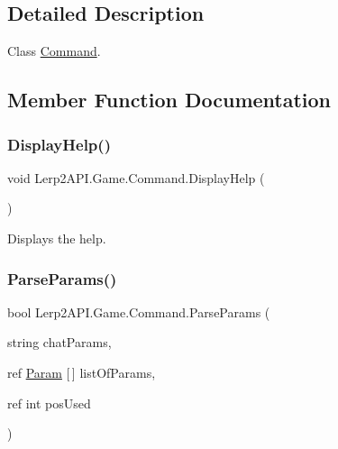\subsection{Detailed Description}
Class \hyperlink{class_lerp2_a_p_i_1_1_game_1_1_command}{Command}. 



\subsection{Member Function Documentation}
\mbox{\label{class_lerp2_a_p_i_1_1_game_1_1_command_a72ec5363a41d6d92d2a65f0c285f0165}} 
\subsubsection{\texorpdfstring{Display\+Help()}{DisplayHelp()}}
{\footnotesize\ttfamily void Lerp2\+A\+P\+I.\+Game.\+Command.\+Display\+Help (\begin{DoxyParamCaption}{ }\end{DoxyParamCaption})\hspace{0.3cm}{\ttfamily [inline]}}



Displays the help. 

\mbox{\label{class_lerp2_a_p_i_1_1_game_1_1_command_ab91b110ae9c032477d20eee8925d0d66}} 
\subsubsection{\texorpdfstring{Parse\+Params()}{ParseParams()}}
{\footnotesize\ttfamily bool Lerp2\+A\+P\+I.\+Game.\+Command.\+Parse\+Params (\begin{DoxyParamCaption}\item[{string}]{chat\+Params,  }\item[{ref \hyperlink{class_lerp2_a_p_i_1_1_game_1_1_param}{Param} \mbox{[}$\,$\mbox{]}}]{list\+Of\+Params,  }\item[{ref int}]{pos\+Used }\end{DoxyParamCaption})\hspace{0.3cm}{\ttfamily [inline]}}



